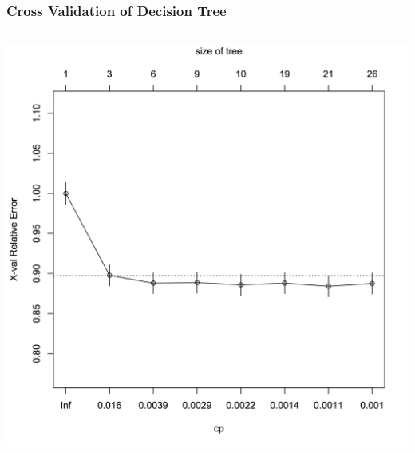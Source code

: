 \documentclass{beamer}
\begin{document}
\begin{frame}
  \frametitle{Cross Validation of Decision Tree}
	\begin{columns}[c] %
    \includegraphics[height=\textheight]{accuracy}
  \end{columns}
\end{frame}

\end{document}
